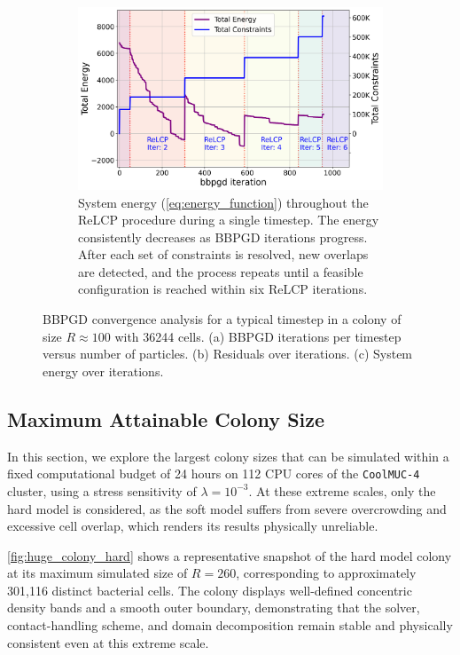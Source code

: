 \documentclass[conference]{IEEEtran}
\begin{document}
\begin{figure}[H]
    \begin{subfigure}[b]{\linewidth}
        \centering
        \includegraphics[width=\linewidth]{figures/bbpgd/bbpgd_total_energy.png}
        \caption{System energy (\autoref{eq:energy_function}) throughout the ReLCP procedure during a single timestep. The energy consistently decreases as BBPGD iterations progress. After each set of constraints is resolved, new overlaps are detected, and the process repeats until a feasible configuration is reached within six ReLCP iterations.}
        \label{fig:bbpgd_energy}
    \end{subfigure}

    \caption{BBPGD convergence analysis for a typical timestep in a colony of size $R \approx 100$ with 36244 cells. (a) BBPGD iterations per timestep versus number of particles. (b) Residuals over iterations. (c) System energy over iterations.}
    \label{fig:bbpgd_analysis}
\end{figure}


\subsection{Maximum Attainable Colony Size}
\label{sec:maximum_colony_size}

In this section, we explore the largest colony sizes that can be simulated within a fixed computational budget of 24 hours on 112 CPU cores of the \texttt{CoolMUC-4} cluster, using a stress sensitivity of $\lambda = 10^{-3}$. At these extreme scales, only the hard model is considered, as the soft model suffers from severe overcrowding and excessive cell overlap, which renders its results physically unreliable.

\autoref{fig:huge_colony_hard} shows a representative snapshot of the hard model colony at its maximum simulated size of $R = 260$, corresponding to approximately 301{,}116 distinct bacterial cells. The colony displays well-defined concentric density bands and a smooth outer boundary, demonstrating that the solver, contact-handling scheme, and domain decomposition remain stable and physically consistent even at this extreme scale.
\end{document}

